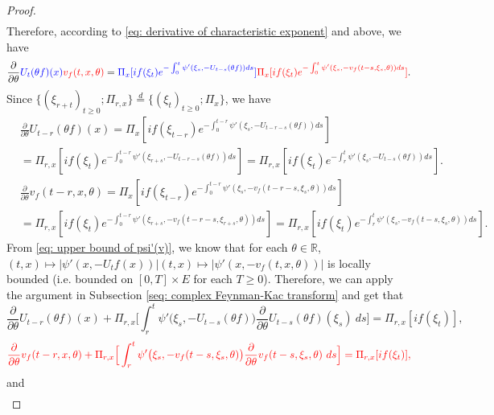 \documentclass[12pt,oneside,english]{amsart}
\theoremstyle{plain}
\theoremstyle{definition}
\numberwithin{equation}{section}
\newcommand{\added}[1]{{\color{blue}#1}}\newcommand{\deleted}[1]{{\color{red}#1}}
\begin{document}
\begin{proof}
\begin{align}
\end{align}
    Therefore, according to \eqref{eq: derivative of characteristic exponent} and above, we have
\begin{align}
    \frac{\partial}{\partial \theta} \added{U_t(\theta f)(x)}\deleted{v_f(t, x, \theta) }
    = \added{ \Pi_x[ if(\xi_t) e^{ - \int_0^t \psi'(\xi_s, -U_{t-s}(\theta f)) ds} ]}\deleted{ \Pi_x[ if(\xi_t) e^{ - \int_0^t \psi'(\xi_s, -v_f(t-s,\xi_s,\theta)) ds} ]}.
\end{align}
    Since $\{(\xi_{r+t})_{t \geq 0}; \Pi_{r,x}\} \overset{d}{=} \{(\xi_{t})_{t\geq 0}; \Pi_{x}\} $, we have
\deleted{
\begin{align}
    &\frac{\partial}{\partial \theta} U_{t-r}(\theta f)( x)
    = \Pi_x[ i f(\xi_{t-r}) e^{-\int_0^{t-r} \psi'(\xi_s, -U_{t-r-s}(\theta f)) ds} ]
    \\&= \Pi_{r,x}[i f(\xi_t)e^{-\int_0^{t-r} \psi'(\xi_{r+s}, -U_{t-r-s}(\theta f)) ds} ]
    = \Pi_{r,x}[if(\xi_t)e^{-\int_r^t \psi'(\xi_{s}, -U_{t-s}(\theta f)) ds} ].
\end{align}}
\deleted{
\begin{align}
    &\frac{\partial}{\partial \theta} v_f(t - r, x, \theta)
    = \Pi_x[ if(\xi_{t-r}) e^{-\int_0^{t-r} \psi'(\xi_s, -v_f(t-r-s,\xi_s,\theta)) ds} ]
    \\&= \Pi_{r,x}[if(\xi_t)e^{-\int_0^{t-r} \psi'(\xi_{r+s}, -v_f(t-r-s,\xi_{r+s},\theta)) ds} ]
    = \Pi_{r,x}[if(\xi_t)e^{-\int_r^t \psi'(\xi_{s}, -v_f(t-s,\xi_{s},\theta)) ds} ].
\end{align}
}
    From \eqref{eq: upper bound of psi'(v)}, we know that for each $\theta\in \mathbb R$, \added{$(t,x) \mapsto |\psi'(x,-U_tf(x))|$}\deleted{$(t,x) \mapsto |\psi'(x,-v_f(t,x,\theta))|$} is locally bounded (i.e. bounded on $[0,T]\times E$ for each $T \geq 0$).
    Therefore, we can apply the argument in Subsection \ref{seq: complex Feynman-Kac transform} and get that
\deleted{
\[
    \frac{\partial}{\partial \theta} U_{t-r}(\theta f)(x) + \Pi_{r,x} \Big[\int_r^t \psi'\big(\xi_s,- U_{t-s}(\theta f)\big)\frac{\partial}{\partial \theta} U_{t-s}(\theta f)(\xi_s)~ds\Big]
    = \Pi_{r,x} [i f(\xi_t)],
\]}
\begin{equation}
    \deleted{\frac{\partial}{\partial \theta} v_f(t-r, x, \theta) + \Pi_{r,x} \Big[\int_r^t \psi'\big(\xi_s,- v_f(t-s,\xi_s,\theta)\big)\frac{\partial}{\partial \theta} v_f(t-s, \xi_s, \theta)~ds\Big]
    = \Pi_{r,x} [i f(\xi_t)],}
\end{equation}
    and
\deleted{
\begin{align}

\end{align}}
\end{proof}
\end{document}
